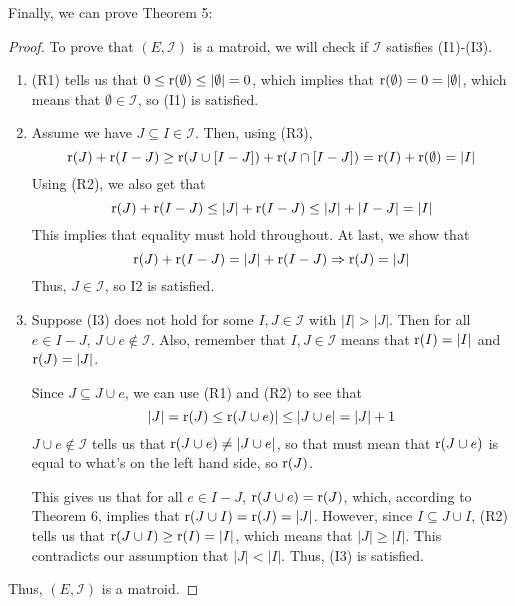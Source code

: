 Finally, we can prove Theorem 5:
\begin{proof}
    To prove that $(E,\mathcal{I})$ is a matroid, we will check if $\mathcal{I}$ satisfies (I1)-(I3).
    \begin{enumerate}
        \item (R1) tells us that $0\leq\operatorname{r}(\emptyset)\leq|\emptyset|=0$, which implies that $\operatorname{r}(\emptyset)=0=|\emptyset|$, which means that $\emptyset\in\mathcal{I}$, so (I1) is satisfied.
        \item Assume we have $J\subseteq I\in\mathcal{I}$. Then, using (R3),
        $$ \operatorname{r}(J)+\operatorname{r}(I-J) \geq \operatorname{r}(J\cup[I-J])+\operatorname{r}(J\cap[I-J]) = \operatorname{r}(I)+\operatorname{r}(\emptyset)=|I| $$
        Using (R2), we also get that
        $$ \operatorname{r}(J)+\operatorname{r}(I-J) \leq |J|+\operatorname{r}(I-J) \leq |J|+|I-J| = |I| $$
        This implies that equality must hold throughout. At last, we show that
        $$ \operatorname{r}(J)+\operatorname{r}(I-J) = |J|+\operatorname{r}(I-J) \Rightarrow \operatorname{r}(J)=|J| $$
        Thus, $J\in\mathcal{I}$, so {I2} is satisfied.
        
        \item Suppose (I3) does not hold for some $I,J\in\mathcal{I}$ with $|I|>|J|$. Then for all $e\in I-J$, $J\cup e\notin \mathcal{I}$. Also, remember that $I,J\in\mathcal{I}$ means that $\operatorname{r}(I)=|I|$ and $\operatorname{r}(J)=|J|$.

        Since $J\subseteq J\cup e$, we can use (R1) and (R2) to see that
        $$ |J|=\operatorname{r}(J)\leq\operatorname{r}(J\cup e)|\leq|J\cup e|=|J|+1 $$
        $J\cup e\notin \mathcal{I}$ tells us that $\operatorname{r}(J\cup e)\neq|J\cup e|$, so that must mean that $\operatorname{r}(J\cup e)$ is equal to what's on the left hand side, so $\operatorname{r}(J)$.

        This gives us that for all $e\in I-J$, $\operatorname{r}(J\cup e)=\operatorname{r}(J)$, which, according to Theorem 6, implies that $\operatorname{r}(J\cup I)=\operatorname{r}(J)=|J|$. However, since $I\subseteq J\cup I$, (R2) tells us that $\operatorname{r}(J\cup I) \geq \operatorname{r}(I) = |I|$, which means that $|J|\geq|I|$. This contradicts our assumption that $|J|<|I|$. Thus, (I3) is satisfied.
    \end{enumerate}
    Thus, $(E,\mathcal{I})$ is a matroid.
\end{proof}

\begin{exmp}
    
\end{exmp}



